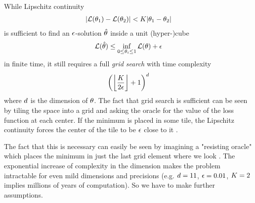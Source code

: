 While Lipschitz continuity 
%
\begin{align*}
	| \mathcal{L}(\theta_1) - \mathcal{L}(\theta_2) | < K | \theta_1 - \theta_2 |
\end{align*}
%
is sufficient to find an \(\epsilon\)-solution \(\hat{\theta}\) inside a unit
(hyper-)cube
%
\begin{align*}
	\mathcal{L}(\hat{\theta}) \le \inf_{ 0\le\theta_i\le 1} \mathcal{L}(\theta) + \epsilon
\end{align*}
%
in finite time, it still requires a full \emph{grid search} with time complexity
%
\begin{align*}
	\left(\left\lfloor \frac{K}{2\epsilon}\right\rfloor + 1\right)^d
\end{align*}
%
where \(d\) is the dimension of \(\theta\). The fact that grid search is
sufficient can be seen by tiling the space into a grid and asking the oracle
for the value of the loss function at each center. If the minimum is placed in
some tile, the Lipschitz continuity forces the center of the tile to be \(\epsilon\)
close to it \parencite[cf.][p. 11]{nesterovLecturesConvexOptimization2018}.

The fact that this is necessary can easily be seen by imagining a "resisting
oracle" which places the minimum in just the last grid element where we look
\parencite[cf.][p. 13]{nesterovLecturesConvexOptimization2018}. The exponential
increase of complexity in the dimension makes the problem intractable for even
mild dimensions and precisions (e.g. \(d=11\), \(\epsilon=0.01\), \(K=2\)
implies millions of years of computation). So we have to make further
assumptions. 




\endinput
